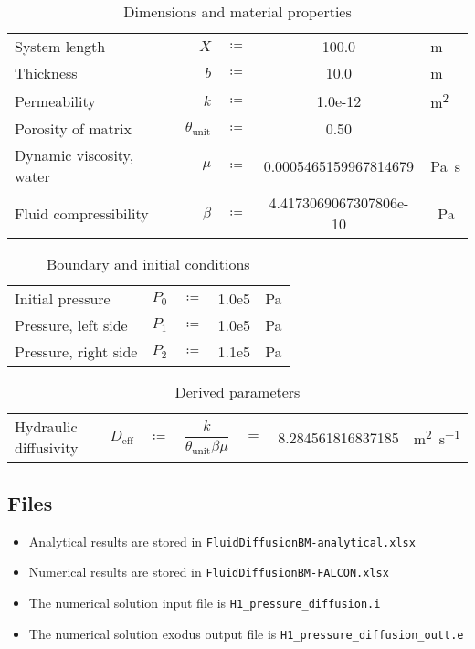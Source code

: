 \begin{table}[h]
	\caption{Dimensions and material properties}
	\begin{center}
	\begin{tabular}{lrcSs}
		 System length & $X$ & $\coloneqq$ &  100.0 & \si{\metre} \\
		 Thickness & $b$ & $\coloneqq$ & 10.0 & \si{\metre} \\
		 Permeability & $k$ & $\coloneqq$ & 1.0e-12 & \si{\metre\squared} \\
		 Porosity of matrix& $\theta_{\text{unit}}$ & $\coloneqq$ & 0.50 &  \\
		 Dynamic viscosity, water & $\mu$ &$\coloneqq$& 0.0005465159967814679 & \si{\pascal\second} \\
		 Fluid compressibility & $\beta$&$\coloneqq$& 4.4173069067307806e-10 & \si{\per\pascal} \\
	\end{tabular}
	\end{center}
	\label{tab:pressDiffDim}
\end{table}
\begin{table}[h]
	\caption{Boundary and initial conditions}
	\begin{center}
	\begin{tabular}{lrcSs}
		Initial pressure & $P_0$ & $\coloneqq$ & 1.0e5 & \si{\pascal} \\
		Pressure, left side & $P_1$ & $\coloneqq$ & 1.0e5 & \si{\pascal} \\
		Pressure, right side & $P_2$ & $\coloneqq$ & 1.1e5 & \si{\pascal} \\
	\end{tabular}
	\end{center}
	\label{tab:pressDiff}
\end{table}
\begin{table}[h]
	\caption{Derived parameters}
	\begin{center}
		\begin{tabular}{lrclcSs}
			Hydraulic diffusivity & $D_{\text{eff}}$ & $\coloneqq$ & $\dfrac{k}{\theta_{\text{unit}}\beta\mu} $ & $=$ & 8.284561816837185 & \si{\metre\squared\per\second} \\
	\end{tabular}
	\end{center}
	\label{tab:pressDiffDerivPar}

\end{table}
\subsection{Files}
\begin{itemize}
	\item Analytical results are stored in \verb|FluidDiffusionBM-analytical.xlsx|
	\item Numerical results are stored in \verb|FluidDiffusionBM-FALCON.xlsx|
	\item The numerical solution input file is \verb|H1_pressure_diffusion.i|
	\item The numerical solution exodus output file is \verb|H1_pressure_diffusion_outt.e|
\end{itemize}

